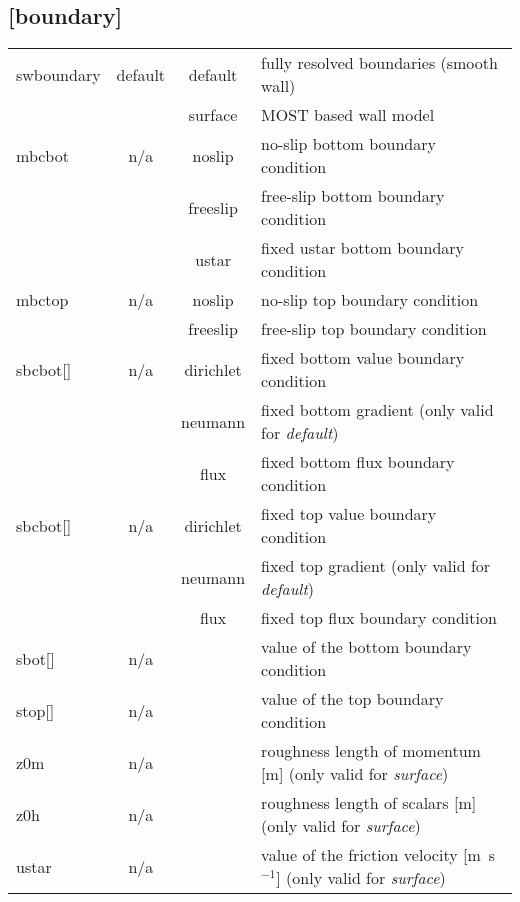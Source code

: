 \documentclass[a4paper,10pt]{extarticle}
\begin{document}
\subsection*{[boundary]}
\tablelasttail{\hline}
\begin{supertabular}{lccl}
swboundary    & default & default   & fully resolved boundaries (smooth wall) \\
              &         & surface   & MOST based wall model \\
mbcbot        & n/a     & noslip    & no-slip bottom boundary condition \\
              &         & freeslip  & free-slip bottom boundary condition \\
              &         & ustar     & fixed ustar bottom boundary condition \\
mbctop        & n/a     & noslip    & no-slip top boundary condition \\
              &         & freeslip  & free-slip top boundary condition\\
sbcbot[]      & n/a     & dirichlet & fixed bottom value boundary condition \\
              &         & neumann   & fixed bottom gradient (only valid for \textit{default}) \\
              &         & flux      & fixed bottom flux boundary condition \\
sbcbot[]      & n/a     & dirichlet & fixed top value boundary condition \\
              &         & neumann   & fixed top gradient (only valid for \textit{default}) \\
              &         & flux      & fixed top flux boundary condition \\
sbot[]        & n/a     &           & value of the bottom boundary condition\\
stop[]        & n/a     &           & value of the top boundary condition \\
z0m           & n/a     &           & roughness length of momentum [m] (only valid for \textit{surface}) \\
z0h           & n/a     &           & roughness length of scalars [m] (only valid for \textit{surface}) \\
ustar         & n/a     &           & value of the friction velocity [m~s$^{-1}$] (only valid for \textit{surface}) \\
\end{supertabular}
\end{document}
